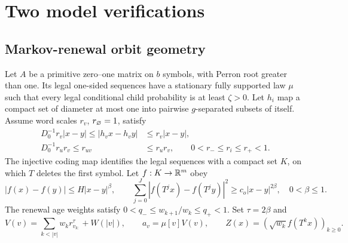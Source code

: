 \section{Two model verifications}\label{sec:v7-instances}
\subsection{Markov-renewal orbit geometry}
Let $A$ be a primitive zero--one matrix on $b$ symbols, with Perron
root greater than one. Its legal one-sided sequences have a stationary
fully supported law $\mu$ such that every legal conditional child
probability is at least $\zeta>0$. Let $h_i$ map a compact set of diameter
at most one into pairwise $g$-separated subsets of itself. Assume word
scales $r_v$, $r_{\varnothing}=1$, satisfy
\begin{align}
 D_0^{-1}r_v|x-y|\le |h_vx-h_vy|&\le r_v|x-y|,\nonumber\\
 D_0^{-1}r_ur_v\le r_{uv}&\le r_ur_v,
 \qquad 0<r_-\le r_i\le r_+<1.                         \label{eq:v7-markov-metric}
\end{align}
The injective coding map identifies the legal sequences with a compact
set $K$, on which $T$ deletes the first symbol. Let $f:K\to\mathbb R^m$ obey
\begin{equation}
 |f(x)-f(y)|\le H|x-y|^\beta,\qquad
 \sum_{j=0}^J|f(T^jx)-f(T^jy)|^2\ge c_o|x-y|^{2\beta},
 \quad 0<\beta\le1.                                   \label{eq:v7-delay}
\end{equation}
The renewal age weights satisfy
$0<q_-\le w_{k+1}/w_k\le q_+<1$.
Set $\tau=2\beta$ and
\begin{equation}
 V(v)=\sum_{k<|v|}w_kr_{v_{k:}}^\tau+W(|v|),\qquad
 a_v=\mu[v]V(v),\qquad
 Z(x)=(\sqrt{w_k}f(T^kx))_{k\ge0}.                    \label{eq:v7-markov-energy}
\end{equation}

